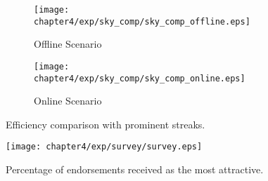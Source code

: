  



\begin{figure}[t]
\centering
    \begin{subfigure}[b]{0.45\textwidth}
        \texttt{[image: chapter4/exp/sky\_comp/sky\_comp\_offline.eps]}
        \caption{Offline Scenario}
    \end{subfigure}
    \begin{subfigure}[b]{0.45\textwidth}
        \texttt{[image: chapter4/exp/sky\_comp/sky\_comp\_online.eps]}
        \caption{Online Scenario}
    \end{subfigure}
\caption{Efficiency comparison with prominent streaks.}
\label{exp:sky_comp}
\end{figure}

\begin{figure}[h]
\centering
\texttt{[image: chapter4/exp/survey/survey.eps]}
\caption{Percentage of endorsements received as the most attractive.}
\label{exp:survey}
\end{figure}

